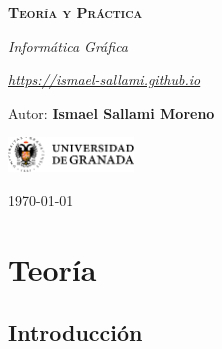 \documentclass[12pt]{report} %
\begin{document}
\begin{titlepage}
    \begin{center}
        \vspace*{2cm}
        
        {\Huge \bfseries\scshape Teoría y Práctica \par}
        \vspace{0.5cm}
        {\Large \itshape Informática Gráfica \par}
        \vspace{0.5cm}
        {\Large \itshape \href{https://ismael-sallami.github.io}{https://ismael-sallami.github.io} \par}


        \vfill
        
        {\LARGE Autor: \textbf{Ismael Sallami Moreno} \par}
        \vspace{0.3cm}
        
        \vspace{1cm}
        \includegraphics[width=0.25\textwidth]{../../../extraFiles/img/ugr.png} %
        \vspace{1cm}
        
        {\large \today}
    \end{center}
    
    \restoregeometry
\end{titlepage}


\thispagestyle{empty} %
\clearpage

\tableofcontents
\thispagestyle{empty} %
\clearpage

\part{Teoría}

\hypertarget{introducciuxf3n}{%
\chapter{Introducción}\label{introducciuxf3n}}
\end{document}
